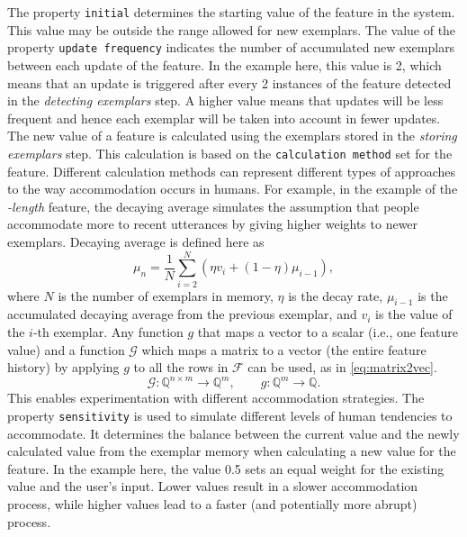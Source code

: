 The property \texttt{initial} determines the starting value of the feature in the system.
This value may be outside the range allowed for new exemplars.
The value of the property \texttt{update frequency} indicates the number of accumulated new exemplars between each update of the feature.
In the example here, this value is 2, which means that an update is triggered after every 2 instances of the feature detected in the \emph{detecting exemplars} step.
A higher value means that updates will be less frequent and hence each exemplar will be taken into account in fewer updates.
The new value of a feature is calculated using the exemplars stored in the \emph{storing exemplars} step.
This calculation is based on the \texttt{calculation method} set for the feature.
Different calculation methods can represent different types of approaches to the way accommodation occurs in humans.
For example, in the example of the \emph{-length} feature, the decaying average simulates the assumption that people accommodate more to recent utterances by giving higher weights to newer exemplars.
Decaying average is defined here as
%
\begin{equation} 
	\label{eq:decaying_average} 
	\mu_n = \frac{1}{N}\sum_{i=2}^{N}(\eta v_i + (1 - \eta )\mu_{i-1}), 
\end{equation} 
\noindent
%
where $N$ is the number of exemplars in memory, $\eta$ is the decay rate, $\mu_{i-1}$ is the accumulated decaying average from the previous exemplar, and $v_i$ is the value of the $i$-th exemplar.
Any function $g$ that maps a vector to a scalar (i.e., one feature value) and a function $\mathcal{G}$ which maps a matrix to a vector (the entire feature history) by applying $g$ to all the rows in $\mathcal{F}$ can be used, as in \cref{eq:matrix2vec}.
%
\begin{equation}
	\label{eq:matrix2vec}
	\mathcal{G}: \mathbb{Q}^{n \times m} \longrightarrow \mathbb{Q}^{m}, \qquad g: \mathbb{Q}^{m} \longrightarrow \mathbb{Q}.
\end{equation}
\noindent
%
This enables experimentation with different accommodation strategies.
The property \texttt{sensitivity} is used to simulate different levels of human tendencies to accommodate.
It determines the balance between the current value and the newly calculated value from the exemplar memory when calculating a new value for the feature.
In the example here, the value 0.5 sets an equal weight for the existing value and the user's input.
Lower values result in a slower accommodation process, while higher values lead to a faster (and potentially more abrupt) process.

